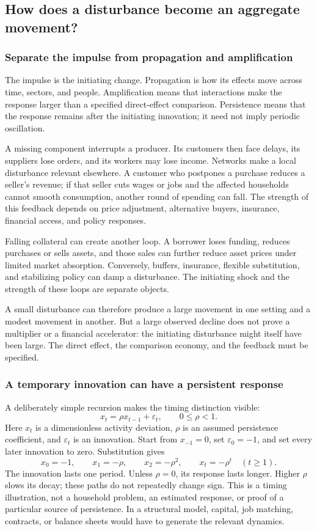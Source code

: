 \subsection{How does a disturbance become an aggregate movement?}

\subsubsection{Separate the impulse from propagation and amplification}

The impulse is the initiating change. Propagation is how its effects move
across time, sectors, and people. Amplification means that interactions make
the response larger than a specified direct-effect comparison. Persistence
means that the response remains after the initiating innovation; it need
not imply periodic oscillation.

A missing component interrupts a producer. Its customers then face delays,
its suppliers lose orders, and its workers may lose income. Networks make
a local disturbance relevant elsewhere. A customer who postpones a purchase
reduces a seller's revenue; if that seller cuts wages or jobs and the affected
households cannot smooth consumption, another round of spending can fall.
The strength of this feedback depends on price adjustment, alternative
buyers, insurance, financial access, and policy responses.

Falling collateral can create another loop. A borrower loses funding,
reduces purchases or sells assets, and those sales can further reduce asset
prices under limited market absorption. Conversely, buffers, insurance,
flexible substitution, and stabilizing policy can damp a disturbance.
The initiating shock and the strength of these loops are separate objects.

A small disturbance can therefore produce a large movement in one setting
and a modest movement in another. But a large observed decline does not
prove a multiplier or a financial accelerator: the initiating disturbance
might itself have been large. The direct effect, the comparison economy,
and the feedback must be specified.

\subsubsection{A temporary innovation can have a persistent response}

A deliberately simple recursion makes the timing distinction visible:
\[
x_t=\rho x_{t-1}+\varepsilon_t,\qquad 0\leq\rho<1.
\]
Here $x_t$ is a dimensionless activity deviation, $\rho$ is an assumed
persistence coefficient, and $\varepsilon_t$ is an innovation. Start from
$x_{-1}=0$, set $\varepsilon_0=-1$, and set every later innovation to zero.
Substitution gives
\[
x_0=-1,\qquad x_1=-\rho,\qquad x_2=-\rho^2,
\qquad x_t=-\rho^t\quad(t\geq1).
\]
The innovation lasts one period. Unless $\rho=0$, its response lasts longer.
Higher $\rho$ slows its decay; these paths do not repeatedly change sign.
This is a timing illustration, not a household problem, an estimated response,
or proof of a particular source of persistence. In a structural model,
capital, job matching, contracts, or balance sheets would have to generate
the relevant dynamics.

